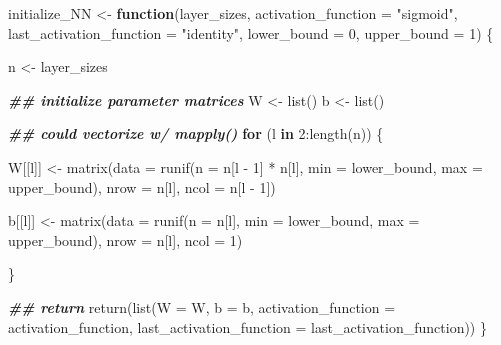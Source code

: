 \documentclass[
]{book}
\newenvironment{Shaded}{\begin{snugshade}}{\end{snugshade}}
\newcommand{\AttributeTok}[1]{\textcolor[rgb]{0.77,0.63,0.00}{#1}}
\newcommand{\ControlFlowTok}[1]{\textcolor[rgb]{0.13,0.29,0.53}{\textbf{#1}}}
\newcommand{\DecValTok}[1]{\textcolor[rgb]{0.00,0.00,0.81}{#1}}
\newcommand{\DocumentationTok}[1]{\textcolor[rgb]{0.56,0.35,0.01}{\textbf{\textit{#1}}}}
\newcommand{\FunctionTok}[1]{\textcolor[rgb]{0.00,0.00,0.00}{#1}}
\newcommand{\NormalTok}[1]{#1}
\newcommand{\OtherTok}[1]{\textcolor[rgb]{0.56,0.35,0.01}{#1}}
\newcommand{\SpecialCharTok}[1]{\textcolor[rgb]{0.00,0.00,0.00}{#1}}
\newcommand{\StringTok}[1]{\textcolor[rgb]{0.31,0.60,0.02}{#1}}
\begin{document}
\begin{Shaded}
\begin{Highlighting}[]
\NormalTok{initialize\_NN }\OtherTok{\textless{}{-}} \ControlFlowTok{function}\NormalTok{(layer\_sizes,}
                          \AttributeTok{activation\_function =} \StringTok{"sigmoid"}\NormalTok{,}
                          \AttributeTok{last\_activation\_function =} \StringTok{"identity"}\NormalTok{,}
                          \AttributeTok{lower\_bound =} \DecValTok{0}\NormalTok{,}
                          \AttributeTok{upper\_bound =} \DecValTok{1}\NormalTok{) \{}
  
\NormalTok{  n }\OtherTok{\textless{}{-}}\NormalTok{ layer\_sizes}
  
  \DocumentationTok{\#\# initialize parameter matrices}
\NormalTok{  W }\OtherTok{\textless{}{-}} \FunctionTok{list}\NormalTok{()}
\NormalTok{  b }\OtherTok{\textless{}{-}} \FunctionTok{list}\NormalTok{()}
  
  \DocumentationTok{\#\# could vectorize w/ mapply()}
  \ControlFlowTok{for}\NormalTok{ (l }\ControlFlowTok{in} \DecValTok{2}\SpecialCharTok{:}\FunctionTok{length}\NormalTok{(n)) \{}
  
\NormalTok{    W[[l]] }\OtherTok{\textless{}{-}} \FunctionTok{matrix}\NormalTok{(}\AttributeTok{data =} \FunctionTok{runif}\NormalTok{(}\AttributeTok{n =}\NormalTok{ n[l }\SpecialCharTok{{-}} \DecValTok{1}\NormalTok{] }\SpecialCharTok{*}\NormalTok{ n[l],}
                                  \AttributeTok{min =}\NormalTok{ lower\_bound,}
                                  \AttributeTok{max =}\NormalTok{ upper\_bound),}
                     \AttributeTok{nrow =}\NormalTok{ n[l],}
                     \AttributeTok{ncol =}\NormalTok{ n[l }\SpecialCharTok{{-}} \DecValTok{1}\NormalTok{])}
  
\NormalTok{    b[[l]] }\OtherTok{\textless{}{-}} \FunctionTok{matrix}\NormalTok{(}\AttributeTok{data =} \FunctionTok{runif}\NormalTok{(}\AttributeTok{n =}\NormalTok{ n[l],}
                                  \AttributeTok{min =}\NormalTok{ lower\_bound,}
                                  \AttributeTok{max =}\NormalTok{ upper\_bound),}
                     \AttributeTok{nrow =}\NormalTok{ n[l],}
                     \AttributeTok{ncol =} \DecValTok{1}\NormalTok{)}
  
\NormalTok{  \}}
  
  \DocumentationTok{\#\# return}
  \FunctionTok{return}\NormalTok{(}\FunctionTok{list}\NormalTok{(}\AttributeTok{W =}\NormalTok{ W,}
              \AttributeTok{b =}\NormalTok{ b,}
              \AttributeTok{activation\_function =}\NormalTok{ activation\_function,}
              \AttributeTok{last\_activation\_function =}\NormalTok{ last\_activation\_function))}
\NormalTok{\}}
\end{Highlighting}
\end{Shaded}
\end{document}
